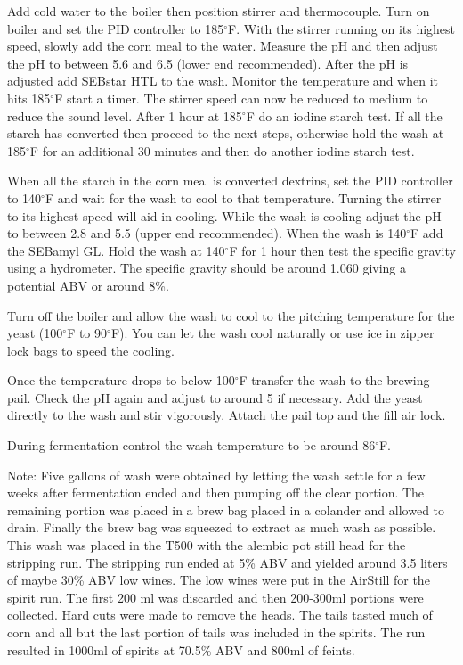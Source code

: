 \documentclass[letterpaper]{recipePMG}
\renewcommand{\deg}{$^\circ$}
\begin{document}



Add cold water to the boiler then position stirrer and thermocouple. Turn on boiler and set the PID controller to 185\deg F. With the stirrer running on its highest speed, slowly add the corn meal to the water. Measure the pH and then adjust the pH to between 5.6 and 6.5 (lower end recommended). After the pH is adjusted add SEBstar HTL to the wash. Monitor the temperature and when it hits 185\deg F start a timer. The stirrer speed can now be reduced to medium to reduce the sound level.  After 1 hour at 185\deg F do an iodine starch test.  If all the starch has converted then proceed to the next steps, otherwise hold the wash at 185\deg F for an additional 30 minutes and then do another iodine starch test.


When all the starch in the corn meal is converted dextrins, set the PID controller to 140\deg F and wait for the wash to cool to that temperature.  Turning the stirrer to its highest speed will aid in cooling. While the wash is cooling adjust the pH to between 2.8 and 5.5 (upper end recommended).  When the wash is 140\deg F add the SEBamyl GL.  Hold the wash at 140\deg F for 1 hour then test the specific gravity using a hydrometer. The specific gravity should be around 1.060 giving a potential ABV or around 8\%.

Turn off the boiler and allow the wash to cool to the pitching temperature for the yeast (100\deg F to 90\deg F). You can let the wash cool naturally or use ice in zipper lock bags to speed the cooling.

Once the temperature drops to below 100\deg F transfer the wash to the brewing pail. Check the pH again and adjust to around 5 if necessary. Add the yeast directly to the wash and stir vigorously. Attach the pail top and the fill air lock.

During fermentation control the wash temperature to be around 86\deg F.

Note: Five gallons of wash were obtained by letting the wash settle for a few weeks after fermentation ended and then pumping off the clear portion.  The remaining portion was placed in a brew bag placed in a colander and allowed to drain.  Finally the brew bag was squeezed to extract as much wash as possible.  This wash was placed in the T500 with the alembic pot still head for the stripping run. The stripping run ended at 5\% ABV and yielded around 3.5 liters of maybe 30\% ABV low wines.  The low wines were put in the AirStill for the spirit run.  The first 200 ml was discarded and then 200-300ml portions were collected.  Hard cuts were made to remove the heads. The tails tasted much of corn and all but the last portion of tails was included in the spirits.  The run resulted in 1000ml of spirits at 70.5\% ABV and 800ml of feints.
\end{document}
